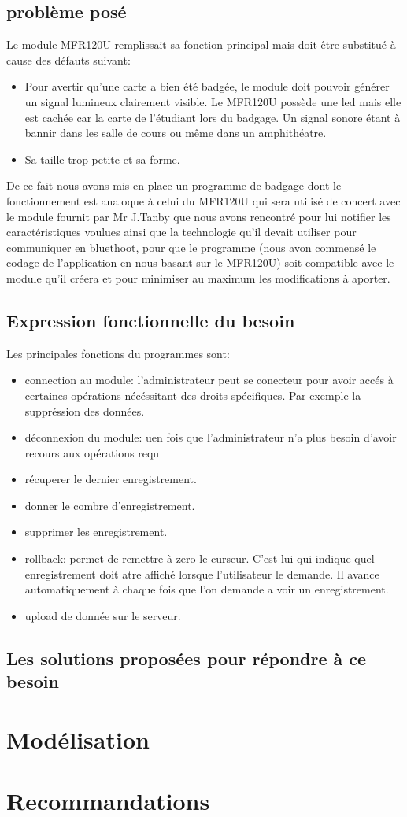     \subsection{problème posé}
    Le module MFR120U remplissait sa fonction principal mais doit être substitué 
    à cause des défauts suivant:

    \begin{itemize}
    \item Pour avertir qu'une carte a bien été badgée, le module doit pouvoir générer 
    un signal lumineux clairement visible. Le MFR120U possède une led mais elle 
    est cachée car la carte de l'étudiant lors du badgage. Un signal sonore étant
    à bannir dans les salle de cours ou même dans un amphithéatre.
    \item Sa taille trop petite et sa forme.
    \end{itemize}

    De ce fait nous avons mis en place un programme de badgage dont le fonctionnement
    est analoque à celui du MFR120U qui sera utilisé de concert avec le module fournit
    par Mr J.Tanby que nous avons rencontré pour lui notifier les caractéristiques
    voulues ainsi que la technologie qu'il devait utiliser pour communiquer en 
    bluethoot, pour que le programme (nous avon commensé le codage de l'application
    en nous basant sur le MFR120U) soit compatible avec le module qu'il créera et 
    pour minimiser au maximum les modifications à aporter.


    \subsection{Expression fonctionnelle du besoin}
     Les principales fonctions du programmes sont:
    \begin{itemize}
    \item connection au module: l'administrateur peut se conecteur pour avoir accés à certaines opérations nécéssitant des droits spécifiques. Par exemple la 
     suppréssion des données.
    \item déconnexion du module: uen fois que l'administrateur n'a plus besoin d'avoir recours aux opérations requ 
    \item récuperer le dernier enregistrement.
    \item donner le combre d'enregistrement.
    \item supprimer les enregistrement.
    \item rollback: permet de remettre à zero le curseur. C'est lui qui indique quel enregistrement doit atre affiché lorsque l'utilisateur le demande. Il avance    
     automatiquement à chaque fois que l'on demande a voir un enregistrement.
    \item upload de donnée sur le serveur.
    \end{itemize}

    \subsection{Les solutions proposées pour répondre à ce besoin}


\section{Modélisation}
\section{Recommandations}
